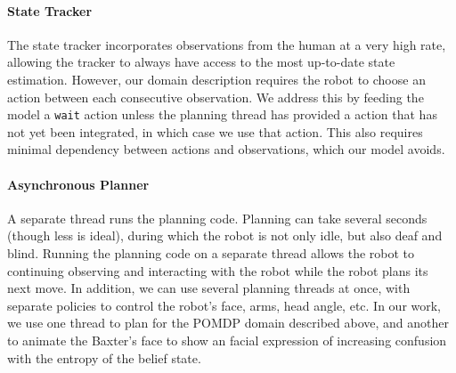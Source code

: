 \documentclass{article}
\begin{document}
\begin{center}
\end{center}




\paragraph{State Tracker} The state tracker incorporates observations from the human at a very high rate, allowing the tracker to always have access to the most up-to-date state estimation. However, our domain description requires the robot to choose an action between each consecutive observation. We address this by feeding the model a \texttt{wait} action unless the planning thread has provided a action that has not yet been integrated, in which case we use that action. This also requires minimal dependency between actions and observations, which our model avoids. 

\paragraph{Asynchronous Planner} A separate thread runs the planning code. Planning can take several seconds (though less is ideal), during which the robot is not only idle, but also deaf and blind. Running the planning code on a separate thread allows the robot to continuing observing and interacting with the robot while the robot plans its next move. In addition, we can use several planning threads at once, with separate policies to control the robot's face, arms, head angle, etc. In our work, we use one thread to plan for the POMDP domain described above, and another to animate the Baxter's face to show an facial expression of increasing confusion with the entropy of the belief state. 
\end{document}

